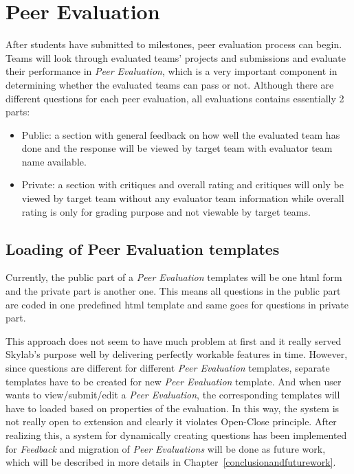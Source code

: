 \chapter{Peer Evaluation} \label{peerevaluation}
 
 After students have submitted to milestones, peer evaluation process can begin. Teams will look through evaluated teams' projects and submissions and evaluate their performance in \textit{Peer Evaluation}, which is a very important component in determining whether the evaluated teams can pass or not. Although there are different questions for each peer evaluation, all evaluations contains essentially 2 parts:

 \begin{itemize}
  \item Public: a section with general feedback on how well the evaluated team has done and the response will be viewed by target team with evaluator team name available.
  \item Private: a section with critiques and overall rating and critiques will only be viewed by target team without any evaluator team information while overall rating is only for grading purpose and not viewable by target teams.
\end{itemize}

\section{Loading of Peer Evaluation templates}

Currently, the public part of a \textit{Peer Evaluation} templates will be one html form and the private part is another one. This means all questions in the public part are coded in one predefined html template and same goes for questions in private part.

This approach does not seem to have much problem at first and it really served Skylab's purpose well by delivering perfectly workable features in time. However, since questions are different for different \textit{Peer Evaluation} templates, separate templates have to be created for new \textit{Peer Evaluation} template. And when user wants to view/submit/edit a \textit{Peer Evaluation}, the corresponding templates will have to loaded based on properties of the evaluation. In this way, the system is not really open to extension and clearly it violates Open-Close principle. After realizing this, a system for dynamically creating questions has been implemented for \textit{Feedback} and migration of \textit{Peer Evaluations} will be done as future work, which will be described in more details in Chapter~\ref{conclusionandfuturework}.
